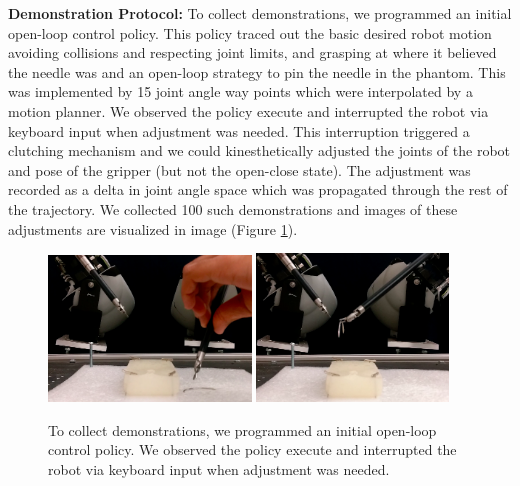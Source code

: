 \vspace{0.5em} \noindent \textbf{Demonstration Protocol: }
To collect demonstrations, we programmed an initial open-loop control policy. This policy traced out the basic desired robot motion avoiding collisions and respecting joint limits, and grasping at where it believed the needle was and an open-loop strategy to pin the needle in the phantom.
This was implemented by 15 joint angle way points which were interpolated by a motion planner.
We observed the policy execute and interrupted the robot via keyboard input when adjustment was needed.
This interruption triggered a clutching mechanism and we could 
kinesthetically adjusted the joints of the robot and pose of the gripper (but not the open-close state).
The adjustment was recorded as a delta in joint angle space which was propagated through the rest of the trajectory.
We collected 100 such demonstrations and images of these adjustments are visualized in image (Figure \ref{fig:demo}).

  \begin{figure}[ht!]
    \centering
    \includegraphics[width=0.48\textwidth]{ddco-experiments/demo-1.png}
    \includegraphics[width=0.455\textwidth]{ddco-experiments/demo-2.png}
    \caption{To collect demonstrations, we programmed an initial open-loop control policy. We observed the policy execute and interrupted the robot via keyboard input when adjustment was needed.  \label{fig:demo}}
\end{figure}


